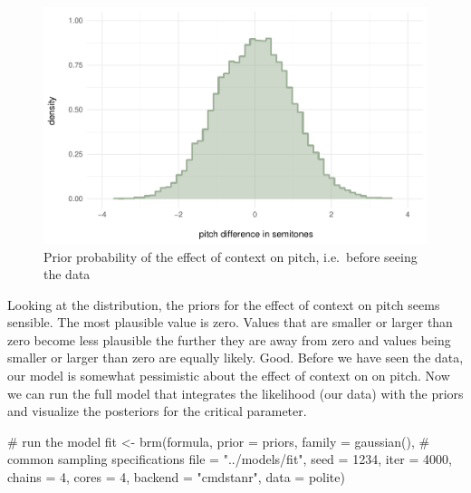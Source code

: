 \documentclass[
  doc,
  longtable,
  nolmodern,
  notxfonts,
  notimes,
  colorlinks=true,linkcolor=blue,citecolor=blue,urlcolor=blue]{apa7}
\newenvironment{Shaded}{\begin{snugshade}}{\end{snugshade}}
\newcommand{\AttributeTok}[1]{\textcolor[rgb]{0.40,0.45,0.13}{#1}}
\newcommand{\CommentTok}[1]{\textcolor[rgb]{0.37,0.37,0.37}{#1}}
\newcommand{\DecValTok}[1]{\textcolor[rgb]{0.68,0.00,0.00}{#1}}
\newcommand{\FunctionTok}[1]{\textcolor[rgb]{0.28,0.35,0.67}{#1}}
\newcommand{\NormalTok}[1]{\textcolor[rgb]{0.00,0.23,0.31}{#1}}
\newcommand{\OtherTok}[1]{\textcolor[rgb]{0.00,0.23,0.31}{#1}}
\newcommand{\StringTok}[1]{\textcolor[rgb]{0.13,0.47,0.30}{#1}}
\begin{document}
\begin{figure}[H]

\caption{Prior probability of the effect of context on pitch,
i.e.~before seeing the data}

{\centering \includegraphics{manuscript_files/figure-pdf/plot-priors-1.pdf}

}

\end{figure}%

Looking at the distribution, the priors for the effect of context on
pitch seems sensible. The most plausible value is zero. Values that are
smaller or larger than zero become less plausible the further they are
away from zero and values being smaller or larger than zero are equally
likely. Good. Before we have seen the data, our model is somewhat
pessimistic about the effect of context on on pitch. Now we can run the
full model that integrates the likelihood (our data) with the priors and
visualize the posteriors for the critical parameter.

\begin{Shaded}
\begin{Highlighting}[]
\CommentTok{\# run the model}
\NormalTok{fit }\OtherTok{\textless{}{-}} \FunctionTok{brm}\NormalTok{(formula,}
           \AttributeTok{prior =}\NormalTok{ priors,}
           \AttributeTok{family =} \FunctionTok{gaussian}\NormalTok{(),}
           \CommentTok{\# common sampling specifications}
           \AttributeTok{file  =} \StringTok{"../models/fit"}\NormalTok{,}
           \AttributeTok{seed =} \DecValTok{1234}\NormalTok{,}
           \AttributeTok{iter =} \DecValTok{4000}\NormalTok{,}
           \AttributeTok{chains =} \DecValTok{4}\NormalTok{,}
           \AttributeTok{cores =} \DecValTok{4}\NormalTok{,}
           \AttributeTok{backend =} \StringTok{"cmdstanr"}\NormalTok{,}
           \AttributeTok{data =}\NormalTok{ polite)}
\end{Highlighting}
\end{Shaded}
\end{document}
